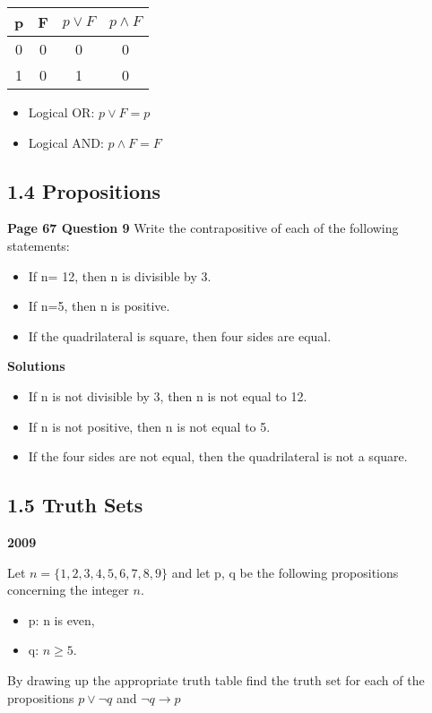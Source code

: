 \documentclass{article}
\begin{document}
\begin{center}
\begin{center}
{\large
\begin{tabular}{|c|c||c|c|}
\hline  p & F & $p \vee F$ & $ p \wedge F$ \\ \hline
\hline  0 & 0 & 0 & 0 \\ 
\hline  1 &  0 & 1 & 0 \\ 
\hline 
\end{tabular} 
}
\end{center}
\begin{itemize}
\item Logical OR:  $p \vee F = p $
\item Logical AND: $p \wedge F = F $
\end{itemize}
\subsection*{1.4 Propositions}
\textbf{Page 67 Question 9}
Write the contrapositive of each of the following statements:

\begin{itemize}
\item If n= 12, then n is divisible by 3.
\item If n=5, then n is positive.
\item If the quadrilateral is square, then four sides are equal.
\end{itemize}

\textbf{Solutions}
\begin{itemize}
\item If n is not divisible by 3, then n is not equal to 12.
\item If n is not positive, then n is not equal to 5.
\item If the four sides are not equal, then the quadrilateral is not a square.
\end{itemize}


\subsection*{1.5 Truth Sets}
\textbf{2009} 

Let $n = \{1, 2,3,4, 5,6,7, 8, 9\}$ and let p, q be the following propositions concerning the integer $n$.
\begin{itemize}
\item p: n is even, 
\item q: $n\geq 5$.
\end{itemize}
By drawing up the appropriate truth table ﬁnd the truth set for each of the
propositions $p \vee \neg q$ and $ \neg q \rightarrow p$


\end{center}
\end{document}
